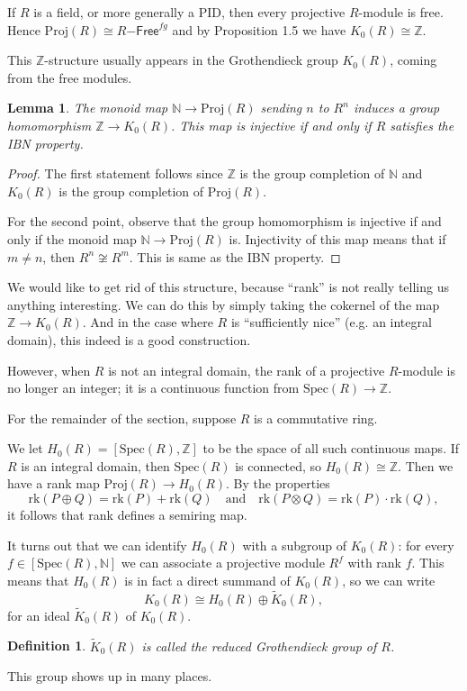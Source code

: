 \documentclass[12pt,reqno]{amsart}
\theoremstyle{plain}
\newtheorem{defn}[thm]{Definition}
\numberwithin{equation}{section}
\newtheorem{lemma}{Lemma}
\begin{document}
If $R$ is a field, or more generally a PID, then every projective $R$-module is free. Hence $\mathrm{Proj}(R) \cong R\mathsf{-Free}^{fg}$ and by Proposition 1.5 we have $K_0(R) \cong \mathbb Z$.

This $\mathbb Z$-structure usually appears in the Grothendieck group $K_0(R)$, coming from the free modules.

\begin{lemma}
    The monoid map $\mathbb N\to \mathrm{Proj}(R)$ sending $n$ to $R^n$ induces a group homomorphism $\mathbb Z\to K_0(R)$. This map is injective if and only if $R$ satisfies the IBN property.
\end{lemma}
\begin{proof}
    The first statement follows since $\mathbb Z$ is the group completion of $\mathbb N$ and $K_0(R)$ is the group completion of $\mathrm{Proj}(R)$. 

    For the second point, observe that the group homomorphism is injective if and only if the monoid map $\mathbb N\to \mathrm{Proj}(R)$ is. Injectivity of this map means that if $m\ne n$, then $R^n\not\cong R^m$. This is same as the IBN property.
\end{proof}

We would like to get rid of this structure, because ``rank'' is not really telling us anything interesting. We can do this by simply taking the cokernel of the map $\mathbb Z\to K_0(R)$. And in the case where $R$ is ``sufficiently nice'' (e.g. an integral domain), this indeed is a good construction.

However, when $R$ is not an integral domain, the rank of a projective $R$-module is no longer an integer; it is a continuous function from $\mathrm{Spec}(R) \to \mathbb Z$. 

For the remainder of the section, suppose $R$ is a commutative ring.

We let $H_0(R) = [\mathrm{Spec}(R),\mathbb Z]$ to be the space of all such continuous maps. If $R$ is an integral domain, then $\mathrm{Spec}(R)$ is connected, so $H_0(R)\cong \mathbb Z$. Then we have a rank map $\mathrm{Proj}(R) \to H_0(R)$. By the properties
\[\mathrm{rk}(P\oplus Q) = \mathrm{rk}(P) + \mathrm{rk}(Q) \quad \text{and}\quad \mathrm{rk}(P\otimes Q) = \mathrm{rk}(P)\cdot \mathrm{rk}(Q),\]
it follows that rank defines a semiring map. 

It turns out that we can identify $H_0(R)$ with a subgroup of $K_0(R)$: for every $f\in [\mathrm{Spec}(R), \mathbb N]$ we can associate a projective module $R^f$ with rank $f$. This means that $H_0(R)$ is in fact a direct summand of $K_0(R)$, so we can write
\[K_0(R) \cong H_0(R)\oplus \widetilde{K}_0(R),\]
for an ideal $\widetilde{K}_0(R)$ of $K_0(R)$.
\begin{defn}
    $\widetilde{K}_0(R)$ is called the \textit{reduced Grothendieck group} of $R$.
\end{defn}
This group shows up in many places.
\end{document}
